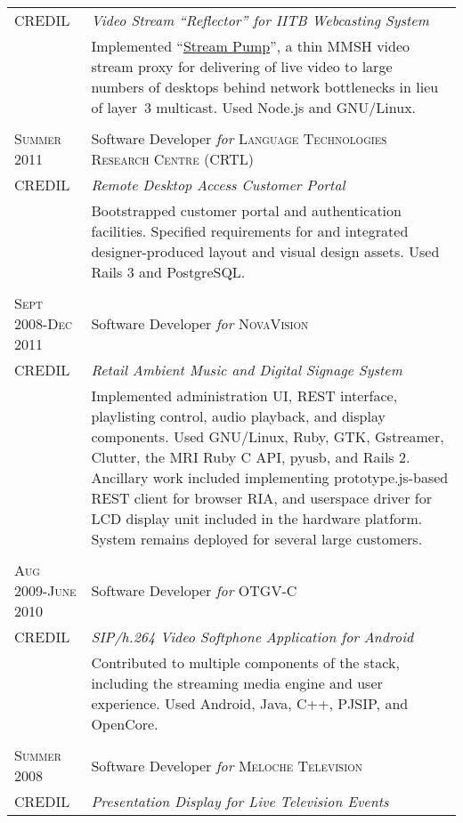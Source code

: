 \documentclass[letterpaper,10pt]{article}
\begin{document}
\begin{longtable}{p{3cm}|p{12cm}}
  \tiny{CREDIL} & \emph{Video Stream ``Reflector'' for IITB Webcasting System} \\
   & \footnotesize{Implemented ``{\href{https://github.com/orospakr/stream-pump}{Stream Pump}}'', a thin MMSH video stream proxy for delivering of live video to large numbers of desktops behind network bottlenecks in lieu of \mbox{layer 3} \mbox{multicast}.  Used Node.js and GNU/Linux.} \\
\multicolumn{2}{c}{} \\
  \textsc{Summer 2011} & Software Developer \emph{for} \textsc{Language Technologies Research Centre (CRTL)} \\
  \tiny{CREDIL} & \emph{Remote Desktop Access Customer Portal} \\
   & \footnotesize{Bootstrapped customer portal and authentication facilities.  Specified requirements for and integrated designer-produced layout and visual design assets.  Used Rails 3 and PostgreSQL.} \\
  \multicolumn{2}{c}{} \\
  \textsc{Sept 2008-Dec 2011} & Software Developer \emph{for} \textsc{NovaVision} \\
  \tiny{CREDIL} & \emph{Retail Ambient Music and Digital Signage System} \\
   & \footnotesize{Implemented administration UI, REST interface, playlisting control, audio playback, and display components.  Used GNU/Linux, Ruby, GTK, Gstreamer, Clutter, the MRI Ruby C API, pyusb, and Rails 2.  Ancillary work included implementing prototype.js-based REST client for browser RIA, and userspace driver for LCD display unit included in the hardware platform. System remains deployed for several large customers.} \\
  \multicolumn{2}{c}{} \\
  \textsc{Aug 2009-June 2010} & Software Developer \emph{for} OTGV-C \\
  \tiny{CREDIL} & \emph{SIP/h.264 Video Softphone Application for Android} \\
  & \footnotesize{Contributed to multiple components of the stack, including the streaming media engine and user experience.  Used Android, Java, C++, PJSIP, and OpenCore.} \\
  \multicolumn{2}{c}{} \\
  \textsc{Summer 2008} & Software Developer \emph{for} \textsc{Meloche Television} \\
  \tiny{CREDIL} & \emph{Presentation Display for Live Television Events} \\

\end{longtable}
\end{document}
